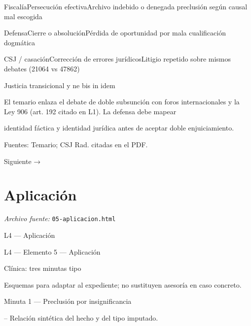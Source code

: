 \documentclass[11pt,a4paper]{article}
\begin{document}
          FiscalíaPersecución efectivaArchivo indebido o denegada preclusión según causal mal escogida\par

          DefensaCierre o absoluciónPérdida de oportunidad por mala cualificación dogmática\par

          CSJ / casaciónCorrección de errores jurídicosLitigio repetido sobre mismos debates (21064 vs 47862)\par








      Justicia transicional y ne bis in idem\par


        El temario enlaza el debate de doble subsunción con foros internacionales y la Ley 906 (art. 192 citado en L1). La defensa debe mapear\par
        identidad fáctica y identidad jurídica antes de aceptar doble enjuiciamiento.\par




    Fuentes: Temario; CSJ Rad. citadas en el PDF.\par

    Siguiente →\par

\section{Aplicaci\'on}
\noindent\textit{Archivo fuente:} \texttt{05-aplicacion.html}

L4 — Aplicación\par





    L4 — Elemento 5 — Aplicación\par
    Clínica: tres minutas tipo\par

    Esquemas para adaptar al expediente; no sustituyen asesoría en caso concreto.\par


      Minuta 1 — Preclusión por insignificancia\par



-- Relación sintética del hecho y del tipo imputado.\par
\end{document}

